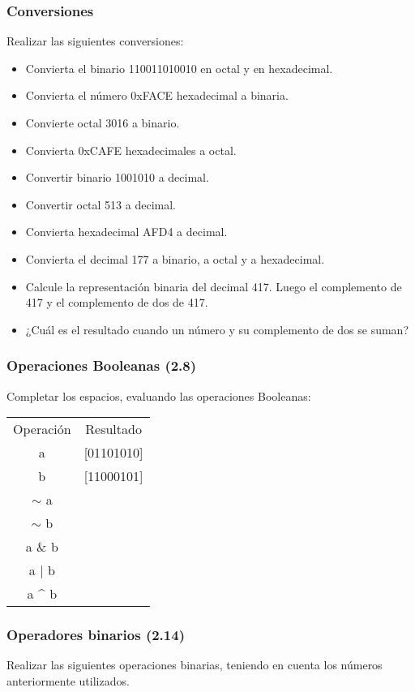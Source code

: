 \subsubsection{Conversiones}
Realizar las siguientes conversiones:
\begin{itemize}
  \item Convierta el binario 110011010010 en octal y en hexadecimal.
  \item Convierta el número 0xFACE hexadecimal a binaria.
  \item Convierte octal 3016 a binario.
  \item Convierta 0xCAFE hexadecimales a octal.
  \item Convertir binario 1001010 a decimal.
  \item Convertir octal 513 a decimal.
  \item Convierta hexadecimal AFD4 a decimal.
  \item Convierta el decimal 177 a binario, a octal y a hexadecimal.
  \item Calcule la representación binaria del decimal 417. Luego el complemento de 417 y el complemento de dos de 417.
  \item ¿Cuál es el resultado cuando un número y su complemento de dos se suman?
\end{itemize}

\subsubsection{ Operaciones Booleanas (2.8)}
Completar los espacios, evaluando las operaciones Booleanas:\\

\begin{tabular}{cc}
  Operación&Resultado\\
  a&[01101010]\\
  b&[11000101]\\
  $\sim$ a&\underspace \\
  $\sim$ b&\underspace \\
  a \& b&\underspace\\
  a $\mid$ b&\underspace\\
  a \^{} b&\underspace\\
\end{tabular}

\subsubsection{Operadores binarios (2.14)}
Realizar las siguientes operaciones binarias, teniendo en cuenta los números anteriormente utilizados.\\

